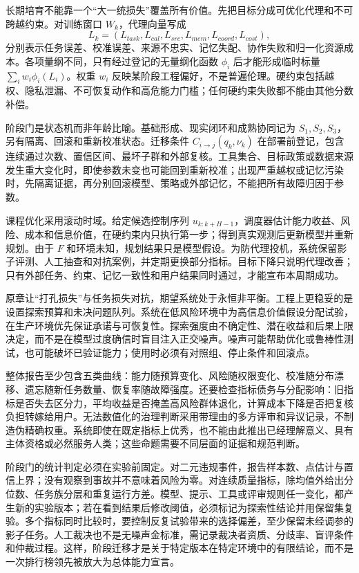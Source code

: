 长期培育不能靠一个“大一统损失”覆盖所有价值。先把目标分成可优化代理和不可跨越约束。对训练窗口 $W_k$，代理向量写成
\begin{equation}
L_k=(L_{task},L_{cal},L_{src},L_{mem},L_{coord},L_{cost}),
\end{equation}
分别表示任务误差、校准误差、来源不忠实、记忆失配、协作失败和归一化资源成本。各项量纲不同，只有经过登记的无量纲化函数 $\phi_i$ 后才能形成临时标量 $\sum_i w_i\phi_i(L_i)$。权重 $w_i$ 反映某阶段工程偏好，不是普遍伦理。硬约束包括越权、隐私泄漏、不可恢复动作和高危能力门槛；任何硬约束失败都不能由其他分数补偿。

阶段门是状态机而非年龄比喻。基础形成、现实闭环和成熟协同记为 $S_1,S_2,S_3$，另有隔离、回滚和重新校准状态。迁移条件 $C_{i\to j}(q_k,\nu_k)$ 在部署前登记，包含连续通过次数、置信区间、最坏子群和外部复核。工具集合、目标政策或数据来源发生重大变化时，即使参数未变也可能回到重新校准；出现严重越权或记忆污染时，先隔离证据，再分别回滚模型、策略或外部记忆，不能把所有故障归因于参数。

课程优化采用滚动时域。给定候选控制序列 $u_{k:k+H-1}$，调度器估计能力收益、风险、成本和信息价值，在硬约束内只执行第一步；得到真实观测后更新模型并重新规划。由于 $F$ 和环境未知，规划结果只是模型假设。为防代理投机，系统保留影子评测、人工抽查和对抗案例，并定期更换部分指标。目标下降只说明代理改善；只有外部任务、约束、记忆一致性和用户结果同时通过，才能宣布本周期成功。

原章让“打孔损失”与任务损失对抗，期望系统处于永恒非平衡。工程上更稳妥的是设置探索预算和未决问题队列。系统在低风险环境中为高信息价值假设分配试验，在生产环境优先保证承诺与可恢复性。探索强度由不确定性、潜在收益和后果上限决定，而不是在模型过度确信时盲目注入正交噪声。噪声可能帮助优化或鲁棒性测试，也可能破坏已验证能力；使用时必须有对照组、停止条件和回滚点。

整体报告至少包含五类曲线：能力随预算变化、风险随权限变化、校准随分布漂移、遗忘随新任务数量、恢复率随故障强度。还要检查指标债务与分配影响：旧指标是否失去区分力，平均收益是否掩盖高风险群体退化，计算成本下降是否把复核负担转嫁给用户。无法数值化的治理判断采用带理由的多方评审和异议记录，不制造伪精确权重。系统即使在既定指标上优秀，也不能由此推出已经理解意义、具有主体资格或必然服务人类；这些命题需要不同层面的证据和规范判断。

阶段门的统计判定必须在实验前固定。对二元违规事件，报告样本数、点估计与置信上界；没有观察到事故并不意味着风险为零。对连续质量指标，除均值外给出分位数、任务族分层和重复运行方差。模型、提示、工具或评审规则任一变化，都产生新的实验版本；若在看到结果后修改阈值，必须标记为探索性结论并用保留集复验。多个指标同时比较时，要控制反复试验带来的选择偏差，至少保留未经调参的影子任务。人工裁决也不是无噪声金标准，需记录裁决者资质、分歧率、盲评条件和仲裁过程。这样，阶段迁移才是关于特定版本在特定环境中的有限结论，而不是一次排行榜领先被放大为总体能力宣言。

